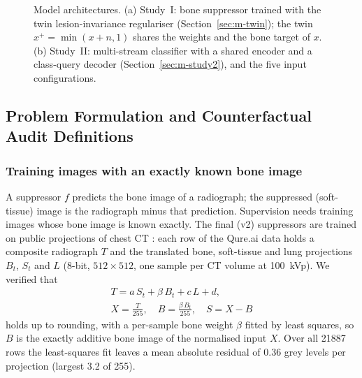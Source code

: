 \begin{figure}[!t]
\centering
{}
\caption{Model architectures. (a) Study~I: bone suppressor trained with the twin lesion-invariance regulariser
(Section~\ref{sec:m-twin}); the twin $x^{+}=\min(x+n,1)$ shares the weights and the bone target of $x$. (b) Study~II: multi-stream
classifier with a shared encoder and a class-query decoder (Section~\ref{sec:m-study2}), and the five input configurations.}
\label{fig:architecture}
\end{figure}



\subsection{Problem Formulation and Counterfactual Audit Definitions}
\label{sec:m-formulation}

\subsubsection{Training images with an exactly known bone image}
\label{sec:m-qure}
A suppressor $f$ predicts the bone image of a radiograph; the suppressed (soft-tissue) image is the radiograph minus that prediction.
Supervision needs training images whose bone image is known exactly. The final (v2) suppressors are trained on public projections of chest
CT \cite{angaitkar2026anatomy}: each row of the Qure.ai data holds a composite radiograph $T$ and the translated bone, soft-tissue and lung
projections $B_t$, $S_t$ and $L$ (8-bit, $512\times512$, one sample per CT volume at 100~kVp). We verified that
\begin{equation}
\begin{gathered}
T=a\,S_t+\beta\,B_t+c\,L+d,\\
X=\frac{T}{255},\quad B=\frac{\beta\,B_t}{255},\quad S=X-B
\end{gathered}
\label{eq:qure}
\end{equation}
holds up to rounding, with a per-sample bone weight $\beta$ fitted by least squares, so $B$ is the exactly additive bone image of the
normalised input $X$. Over all \num{21887} rows the least-squares fit leaves a mean absolute residual of 0.36 grey levels per projection
(largest 3.2 of 255).

